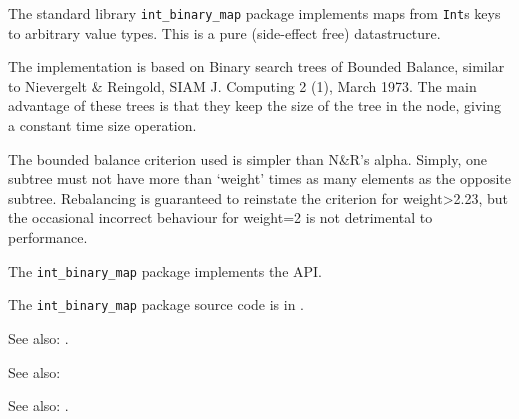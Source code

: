 
The standard library {\tt int\_binary\_map} package implements maps from 
{\tt Int}s keys to arbitrary value types. This is a pure (side-effect free) 
datastructure.  

The implementation is based on Binary search trees of Bounded 
Balance, similar to Nievergelt & Reingold, SIAM J. Computing 
2 (1), March 1973.  The main advantage of these trees is that 
they keep the size of the tree in the node, giving a constant 
time size operation.

The bounded balance criterion used is simpler than N&R's alpha. 
Simply, one subtree must not have more than `weight' times as 
many elements as the opposite subtree.  Rebalancing is 
guaranteed to reinstate the criterion for weight>2.23, but 
the occasional incorrect behaviour for weight=2 is not 
detrimental to performance.

The {\tt int\_binary\_map} package implements the  API.

The {\tt int\_binary\_map} package source code is in .

See also:  .

See also:  

See also:  .

